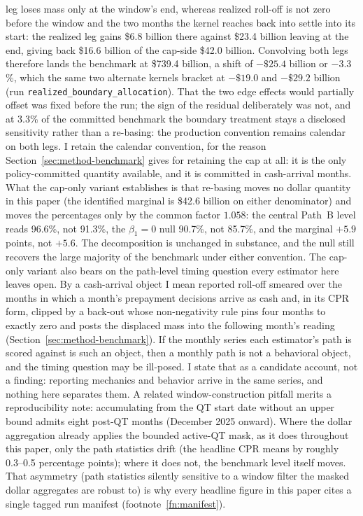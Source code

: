 \documentclass[12pt]{article}
\begin{document}
leg loses mass only at the window's end, whereas realized roll-off is not zero before the window and the two months the kernel reaches back into settle into its start: the realized leg gains \$6.8 billion there against \$23.4 billion leaving at the end, giving back \$16.6 billion of the cap-side \$42.0 billion. Convolving both legs therefore lands the benchmark at \$739.4 billion, a shift of $-\$25.4$ billion or $-3.3$\%, which the same two alternate kernels bracket at $-\$19.0$ and $-\$29.2$ billion (run \texttt{realized\_boundary\_allocation}). That the two edge effects would partially offset was fixed before the run; the sign of the residual deliberately was not, and at 3.3\% of the committed benchmark the boundary treatment stays a disclosed sensitivity rather than a re-basing: the production convention remains calendar on both legs. I retain the calendar convention, for the reason Section~\ref{sec:method-benchmark} gives for retaining the cap at all: it is the only policy-committed quantity available, and it is committed in cash-arrival months. What the cap-only variant establishes is that re-basing moves no dollar quantity in this paper (the identified marginal is \$42.6 billion on either denominator) and moves the percentages only by the common factor $1.058$: the central Path~B level reads 96.6\%, not 91.3\%, the $\beta_1 = 0$ null 90.7\%, not 85.7\%, and the marginal $+5.9$ points, not $+5.6$. The decomposition is unchanged in substance, and the null still recovers the large majority of the benchmark under either convention. The cap-only variant also bears on the path-level timing question every estimator here leaves open. By a cash-arrival object I mean reported roll-off smeared over the months in which a month's prepayment decisions arrive as cash and, in its CPR form, clipped by a back-out whose non-negativity rule pins four months to exactly zero and posts the displaced mass into the following month's reading (Section~\ref{sec:method-benchmark}). If the monthly series each estimator's path is scored against is such an object, then a monthly path is not a behavioral object, and the timing question may be ill-posed. I state that as a candidate account, not a finding: reporting mechanics and behavior arrive in the same series, and nothing here separates them. A related window-construction pitfall merits a reproducibility note: accumulating from the QT start date without an upper bound admits eight post-QT months (December 2025 onward). Where the dollar aggregation already applies the bounded active-QT mask, as it does throughout this paper, only the path statistics drift (the headline CPR means by roughly 0.3--0.5 percentage points); where it does not, the benchmark level itself moves. That asymmetry (path statistics silently sensitive to a window filter the masked dollar aggregates are robust to) is why every headline figure in this paper cites a single tagged run manifest (footnote~\ref{fn:manifest}).
\end{document}
